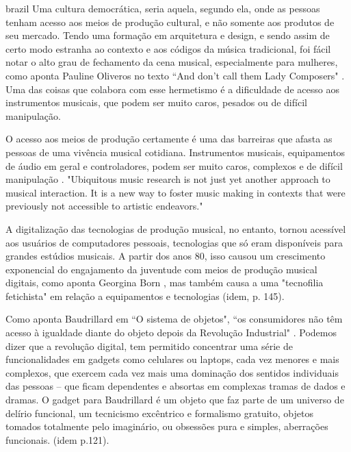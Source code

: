 \begin{otherlanguage*}{brazil}
Uma cultura democrática, seria aquela, segundo ela, onde as pessoas tenham acesso aos meios de produção cultural, e não somente aos produtos de seu mercado. Tendo uma formação em arquitetura e design, e sendo assim de certo modo estranha ao contexto e aos códigos da música tradicional, foi fácil notar o alto grau de fechamento da cena musical, especialmente para mulheres, como aponta Pauline Oliveros no texto ``And don't call them Lady Composers" \cite[48]{Oliveros2012}. Uma das coisas que colabora com esse hermetismo é a dificuldade de acesso aos instrumentos musicais, que podem ser muito caros, pesados ou de difícil manipulação. 



O acesso aos meios de produção certamente é uma das barreiras que afasta as pessoas de uma vivência musical cotidiana. Instrumentos musicais, equipamentos de áudio em geral e controladores, podem ser muito caros, complexos e de difícil manipulação\cite{Fiebrink2007} . "Ubiquitous music research is not just yet
another approach to musical interaction. It is a new way to foster music making in contexts
that were previously not accessible to artistic endeavors." \cite{Keller2018}

A digitalização das tecnologias de produção musical, no entanto, tornou acessível aos usuários de computadores pessoais, tecnologias que só eram disponíveis para grandes estúdios musicais. A partir dos anos 80, isso causou um crescimento exponencial do engajamento da juventude com meios de produção musical digitais, como aponta Georgina Born \cite[143]{Born2015}, mas também causa a uma "tecnofilia fetichista" em relação a equipamentos e tecnologias (idem, p. 145).

Como aponta Baudrillard em ``O sistema de objetos", ``os consumidores não têm acesso à igualdade diante do objeto depois da Revolução Industrial" \cite[162]{Baudrillard2012}. Podemos dizer que a revolução digital, tem permitido concentrar uma série de funcionalidades em gadgets como celulares ou laptops, cada vez menores e mais complexos, que exercem cada vez mais uma dominação dos sentidos individuais das pessoas – que ficam dependentes e absortas em complexas tramas de dados e dramas. O gadget para Baudrillard é um objeto que faz parte de um universo de delírio funcional, um tecnicismo excêntrico e formalismo gratuito, objetos tomados totalmente pelo imaginário, ou obsessões pura e simples, aberrações funcionais. (idem p.121). 


\end{otherlanguage*}
